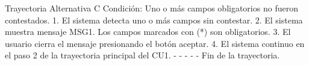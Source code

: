 Trayectoria Alternativa C
Condición: Uno o más campos obligatorios no fueron contestados.
1.	El sistema detecta uno o más campos sin contestar.
2.	El sistema muestra mensaje MSG1. Los campos marcados con (*) son obligatorios.
3.	El usuario cierra el mensaje presionando el botón aceptar.
4.	El sistema continuo en el paso 2 de la trayectoria principal del CU1.
-	- - - - Fin de la trayectoria.




